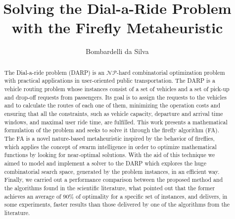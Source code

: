 \documentclass[tuberlin,cic,tc,openright,english,noabntcite,oneside]{iiufrgs}
\title{Solving the Dial-a-Ride Problem with the Firefly Metaheuristic}
\author{Bombardelli da Silva}{Fernando}
\begin{document}
\maketitle





\begin{abstract}
The Dial-a-ride problem (DARP) is an $\mathcal{NP}$-hard combinatorial optimization problem with practical applications in user-oriented public transportation. The DARP is a vehicle routing problem whose instances consist of a set of vehicles and a set of pick-up and drop-off requests from passengers. Its goal is to assign the requests to the vehicles and to calculate the routes of each one of them, minimizing the operation costs and ensuring that all the constraints, such as vehicle capacity, departure and arrival time windows, and maximal user ride time, are fulfilled. This work presents a mathematical formulation of the problem and seeks to solve it through the firefly algorithm (FA). The FA is a novel nature-based metaheuristic inspired by the behavior of fireflies, which applies the concept of swarm intelligence in order to optimize mathematical functions by looking for near-optimal solutions. With the aid of this technique we aimed to model and implement a solver to the DARP which explores the huge combinatorial search space, generated by the problem instances, in an efficient way. Finally, we carried out a performance comparison between the proposed method and the algorithms found in the scientific literature, what pointed out that the former achieves an average of 90\% of optimality for a specific set of instances, and delivers, in some experiments, faster results than those delivered by one of the algorithms from the literature.
\end{abstract}
\end{document}
